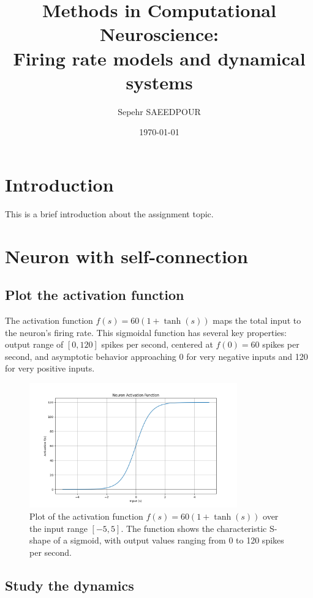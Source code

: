 \documentclass{article}
\title{Methods in Computational Neuroscience:\\Firing rate models and dynamical systems}
\author{Sepehr SAEEDPOUR}
\date{\today}
\begin{document}
\maketitle

\section*{Introduction}
This is a brief introduction about the assignment topic.

\section{Neuron with self-connection}

\subsection{Plot the activation function}

The activation function $f(s) = 60(1 + \tanh(s))$ maps the total input to the neuron's firing rate. 
This sigmoidal function has several key properties: output range of $[0, 120]$ spikes per second, centered at $f(0) = 60$ spikes per second, and asymptotic behavior approaching 0 for very negative inputs and 120 for very positive inputs. 



\begin{figure}[H]
    \centering
    \includegraphics[width=0.8\textwidth]{activation_function.png}
    \caption{Plot of the activation function $f(s) = 60(1 + \tanh(s))$ over the input range $[-5, 5]$. The function shows the characteristic S-shape of a sigmoid, with output values ranging from 0 to 120 spikes per second.}
    \label{fig:activation}
\end{figure}

\subsection{Study the dynamics}
\end{document}
